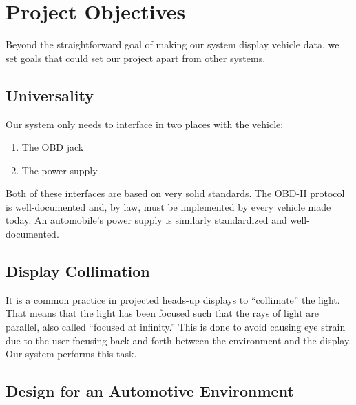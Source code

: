 \chapter{Project Objectives}



Beyond the straightforward goal of making our system display vehicle data, we
set goals that could set our project apart from other systems.

\section{Universality}

Our system only needs to interface in two places with the vehicle:

\begin{enumerate}

\item The OBD jack
\item The power supply

\end{enumerate}

Both of these interfaces are based on very solid standards. The OBD-II protocol
is well-documented and, by law, must be implemented by every vehicle made
today. An automobile's power supply is similarly standardized and
well-documented.

\section{Display Collimation}

It is a common practice in projected heads-up displays to ``collimate'' the
light. That means that the light has been focused such that the rays of light
are parallel, also called ``focused at infinity.'' This is done to avoid
causing eye strain due to the user focusing back and forth between the
environment and the display. Our system performs this task.

\section{Design for an Automotive Environment}
